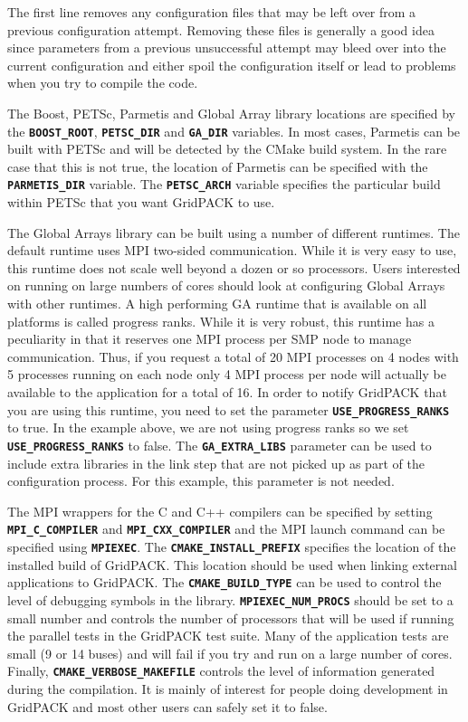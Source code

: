 The first line removes any configuration files that may be left over from a previous configuration attempt. Removing these files is generally a good idea since parameters from a previous unsuccessful attempt may bleed over into the current configuration and either spoil the configuration itself or lead to problems when you try to compile the code. 

The Boost, PETSc, Parmetis and Global Array library locations are specified by
the \texttt{\textbf{BOOST\_ROOT}}, \texttt{\textbf{PETSC\_DIR}} and
\texttt{\textbf{GA\_DIR}} variables. In most cases, Parmetis can be built with
PETSc and will be detected by the CMake build system. In the rare case that this
is not true, the location of Parmetis can be specified with the
\texttt{\textbf{PARMETIS\_DIR}} variable.  The \texttt{\textbf{PETSC\_ARCH}} variable specifies the particular build within PETSc that you want GridPACK to use.

The Global Arrays library can be built using a number of different runtimes. The default runtime uses MPI two-sided communication. While it is very easy to use, this runtime does not scale well beyond a dozen or so processors. Users interested on running on large numbers of cores should look at configuring Global Arrays with other runtimes. A high performing GA runtime that is available on all platforms is called progress ranks. While it is very robust, this runtime has a peculiarity in that it reserves one MPI process per SMP node to manage communication. Thus, if you request a total of 20 MPI processes on 4 nodes with 5 processes running on each node only 4 MPI process per node will actually be available to the application for a total of 16. In order to notify GridPACK that you are using this runtime, you need to set the parameter \texttt{\textbf{USE\_PROGRESS\_RANKS}} to true. In the example above, we are not using progress ranks so we set \texttt{\textbf{USE\_PROGRESS\_RANKS}} to false.  The \texttt{\textbf{GA\_EXTRA\_LIBS}} parameter can be used to include extra libraries in the link step that are not picked up as part of the configuration process. For this example, this parameter is not needed.

The MPI wrappers for the C and C++ compilers can be specified by setting \texttt{\textbf{MPI\_C\_COMPILER}} and \texttt{\textbf{MPI\_CXX\_COMPILER}} and the MPI launch command can be specified using \texttt{\textbf{MPIEXEC}}. The \texttt{\textbf{CMAKE\_INSTALL\_PREFIX}} specifies the location of the installed build of GridPACK. This location should be used when linking external applications to GridPACK. The \texttt{\textbf{CMAKE\_BUILD\_TYPE}} can be used to control the level of debugging symbols in the library. \texttt{\textbf{MPIEXEC\_NUM\_PROCS}} should be set to a small number and controls the number of processors that will be used if running the parallel tests in the GridPACK test suite. Many of the application tests are small (9 or 14 buses) and will fail if you try and run on a large number of cores. Finally, \texttt{\textbf{CMAKE\_VERBOSE\_MAKEFILE}} controls the level of information generated during the compilation. It is mainly of interest for people doing development in GridPACK and most other users can safely set it to false.

